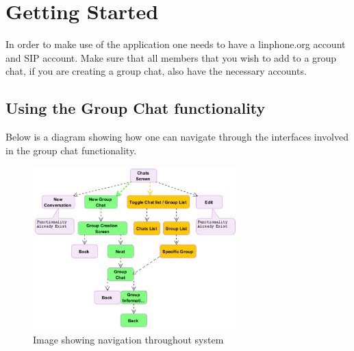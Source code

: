 \documentclass[11pt]{article}
\begin{document}
\section{Getting Started}
In order to make use of the application one needs to have a linphone.org account and SIP account. Make sure that all members that you wish to add to a group chat, if you are creating a group chat, also have the necessary accounts.
\subsection{Using the Group Chat functionality}
Below is a diagram showing how one can navigate through the interfaces involved in the group chat functionality. \\
\begin{figure}[H]
\includegraphics[width=300px]{./images/flow.png}
 \caption{Image showing navigation throughout system}
 \label{flow}
 \end{figure}
\end{document}
